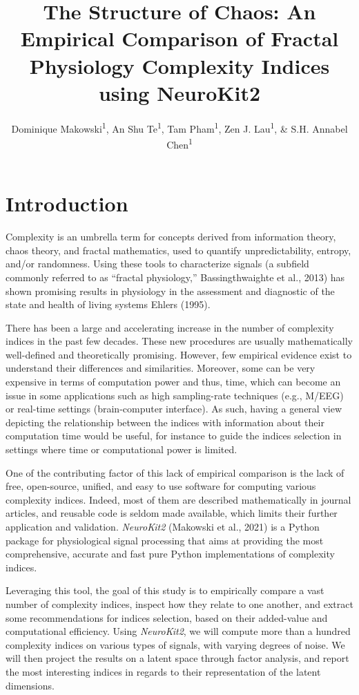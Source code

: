 \documentclass[
  man]{apa6}
\title{\textbf{The Structure of Chaos: An Empirical Comparison of Fractal Physiology Complexity Indices using NeuroKit2}}
\author{Dominique Makowski\textsuperscript{1}, An Shu Te\textsuperscript{1}, Tam Pham\textsuperscript{1}, Zen J. Lau\textsuperscript{1}, \& S.H. Annabel Chen\textsuperscript{1}}
\date{}
\affiliation{\vspace{0.5cm}\textsuperscript{1} Nanyang Technological University}
\begin{document}
\maketitle

\hypertarget{introduction}{%
\section{Introduction}\label{introduction}}

Complexity is an umbrella term for concepts derived from information theory, chaos theory, and fractal mathematics, used to quantify unpredictability, entropy, and/or randomness. Using these tools to characterize signals (a subfield commonly referred to as ``fractal physiology,'' Bassingthwaighte et al., 2013) has shown promising results in physiology in the assessment and diagnostic of the state and health of living systems Ehlers (1995).

There has been a large and accelerating increase in the number of complexity indices in the past few decades. These new procedures are usually mathematically well-defined and theoretically promising. However, few empirical evidence exist to understand their differences and similarities. Moreover, some can be very expensive in terms of computation power and thus, time, which can become an issue in some applications such as high sampling-rate techniques (e.g., M/EEG) or real-time settings (brain-computer interface). As such, having a general view depicting the relationship between the indices with information about their computation time would be useful, for instance to guide the indices selection in settings where time or computational power is limited.

One of the contributing factor of this lack of empirical comparison is the lack of free, open-source, unified, and easy to use software for computing various complexity indices. Indeed, most of them are described mathematically in journal articles, and reusable code is seldom made available, which limits their further application and validation. \emph{NeuroKit2} (Makowski et al., 2021) is a Python package for physiological signal processing that aims at providing the most comprehensive, accurate and fast pure Python implementations of complexity indices.

Leveraging this tool, the goal of this study is to empirically compare a vast number of complexity indices, inspect how they relate to one another, and extract some recommendations for indices selection, based on their added-value and computational efficiency. Using \emph{NeuroKit2}, we will compute more than a hundred complexity indices on various types of signals, with varying degrees of noise. We will then project the results on a latent space through factor analysis, and report the most interesting indices in regards to their representation of the latent dimensions.
\end{document}
